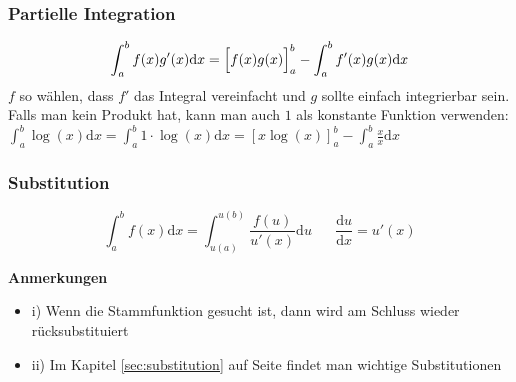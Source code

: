 \documentclass[8pt, a4paper, landscape, fleqn]{scrartcl}
\newenvironment {annotation}[1]
				{\begin{itshape} \begin{small} \textbf{#1} \begin{itemize}}
				{\end{itemize} \end{small} \end{itshape}}
\def\d{\text{d}}
\begin{document}
\begin{multicols*}{3}
				\subsubsection{Partielle Integration}
					\begin{equation*}
						\int_{a}^{b}f(x)g'(x)\text{d}x= \Big{[}f(x)g(x)\Big{]}_a^b-\int_{a}^{b}f'(x)g(x)\text{d}x
					\end{equation*}
					$f$ so wählen, dass $f'$ das Integral vereinfacht und $g$ sollte einfach integrierbar sein. \\
					Falls man kein Produkt hat, kann man auch $1$ als konstante Funktion verwenden: $\int_a^b \log(x) \d x = \int_a^b 1 \cdot \log(x) \d x = [x\log(x)]_a^b - \int_a^b \frac{x}{x}\d x$
				\subsubsection{Substitution}
					\begin{equation*}
						\int_{a}^{b}f(x)\text{d}x=\int_{u(a)}^{u(b)} \frac{f(u)}{u'(x)}\text{d}u \hspace{20pt} \frac{\text{d}u}{\text{d}x}=u'(x)
					\end{equation*}
					\begin{annotation}{Anmerkungen}
						\item[i)] Wenn die Stammfunktion gesucht ist, dann wird am Schluss wieder rücksubstituiert
						\item[ii)] Im Kapitel \ref{sec:substitution} auf Seite \pageref{sec:substitution} findet man wichtige Substitutionen
					\end{annotation}

\end{multicols*}
\end{document}

